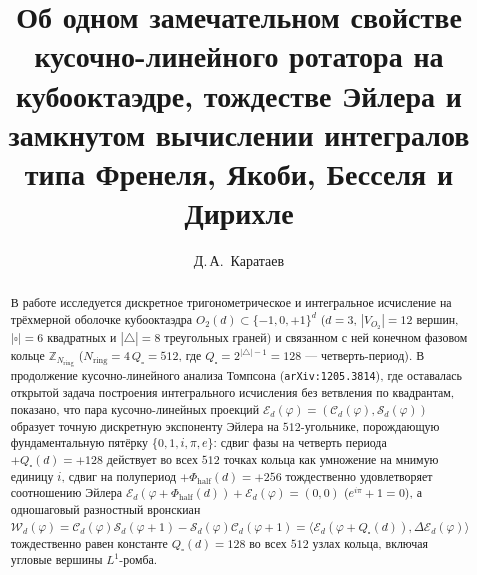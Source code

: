 \documentclass[11pt,a4paper]{article}
\title{\textbf{Об одном замечательном свойстве кусочно-линейного ротатора на кубооктаэдре, тождестве Эйлера и замкнутом вычислении интегралов типа Френеля, Якоби, Бесселя и Дирихле}}
\author{Д.\,А.~Каратаев}
\date{}
\theoremstyle{plain}
\theoremstyle{definition}
\begin{document}
\maketitle

\begin{abstract}
В работе исследуется дискретное тригонометрическое и интегральное исчисление на трёхмерной оболочке кубооктаэдра $O_2(d)\subset\{-1,0,+1\}^d$ ($d=3$, $|V_{O_2}|=12$ вершин, $|\square|=6$ квадратных и $|\triangle|=8$ треугольных граней) и связанном с ней конечном фазовом кольце $\mathbb{Z}_{N_{\mathrm{ring}}}$ ($N_{\mathrm{ring}} = 4\,Q_\square = 512$, где $Q_\square = 2^{|\triangle|-1} = 128$ --- четверть-период). В продолжение кусочно-линейного анализа Томпсона (\texttt{arXiv:1205.3814}), где оставалась открытой задача построения интегрального исчисления без ветвления по квадрантам, показано, что пара кусочно-линейных проекций $\mathcal{E}_d(\varphi) = (\mathcal{C}_d(\varphi),\mathcal{S}_d(\varphi))$ образует точную дискретную экспоненту Эйлера на $512$-угольнике, порождающую фундаментальную пятёрку $\{0,1,i,\pi,e\}$: сдвиг фазы на четверть периода $+Q_\square(d)=+128$ действует во всех $512$ точках кольца как умножение на мнимую единицу $i$, сдвиг на полупериод $+\Phi_{\mathrm{half}}(d)=+256$ тождественно удовлетворяет соотношению Эйлера $\mathcal{E}_d(\varphi+\Phi_{\mathrm{half}}(d))+\mathcal{E}_d(\varphi)=(0,0)$ ($e^{i\pi}+1=0$), а одношаговый разностный вронскиан $\mathcal{W}_d(\varphi)=\mathcal{C}_d(\varphi)\mathcal{S}_d(\varphi+1)-\mathcal{S}_d(\varphi)\mathcal{C}_d(\varphi+1)=\langle \mathcal{E}_d(\varphi+Q_\square(d)),\Delta\mathcal{E}_d(\varphi)\rangle$ тождественно равен константе $Q_\square(d)=128$ во всех $512$ узлах кольца, включая угловые вершины $L^1$-ромба.


\end{abstract}
\end{document}
